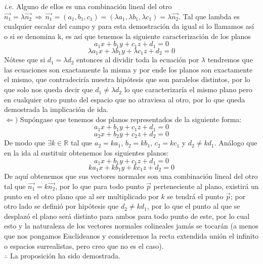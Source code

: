 \documentclass{article}
\begin{document}
\textit{i.e.} Alguno de ellos es una combinación lineal del otro $\Vec{n_1}=\lambda\Vec{n_2} \, \Rightarrow \, \Vec{n_1} = (a_1,b_1,c_1) = (\lambda a_1,\lambda b_1,\lambda c_1) = \lambda\Vec{n_2}$. Tal que lambda es cualquier escalar del campo y para esta demostración da igual si lo llamamos así o si se denomina k, es así que tenemos la siguiente caracterización de los planos
\begin{equation*}
    a_1x + b_1y + c_1z + d_1 = 0
\end{equation*}
\begin{equation*}
    \lambda a_1x + \lambda b_1y + \lambda c_1z + d_2 = 0
\end{equation*}
Nótese que si $d_1=\lambda d_2$ entonces al dividir toda la ecuación por $\lambda$ tendremos que las ecuaciones son exactamente la misma y por ende los planos son exactamente el mismo, que contradeciría nuestra hipótesis que son paralelos distintos, por lo que solo nos queda decir que $d_1 \neq \lambda d_2$ lo que caracterizaría el mismo plano pero en cualquier otro punto del espacio que no atraviesa al otro, por lo que queda demostrada la implicación de ida. \\
$\Leftarrow)$ Supóngase que tenemos dos planos representados de la siguiente forma:
\begin{equation*}
    a_1x + b_1y + c_1z + d_1 = 0
\end{equation*}
\begin{equation*}
    a_2x + b_2y + c_2z + d_2 = 0
\end{equation*}
De modo que $\exists k \in \mathbb{R}$ tal que $a_2=ka_1$, $b_2=kb_1$, $c_2=kc_1$ y $d_2 \neq kd_1$. Análogo que en la ida al sustituir obtenemos los siguientes planos:
\begin{equation*}
    a_1x + b_1y + c_1z + d_1 = 0
\end{equation*}
\begin{equation*}
    k a_1x + k b_1y + k c_1z + d_2 = 0
\end{equation*}
De aquí obtenemos que sus vectores normales son una combinación lineal del otro tal que $\Vec{n_1}=k\Vec{n_2}$, por lo que para todo punto $\Vec{p}$ perteneciente al plano, existirá un punto en el otro plano que al ser multiplicado por $k$ se tendrá el punto $\Vec{p}$; por otro lado se definió por hipótesis que $d_2 \neq kd_1$, por lo que el punto al que se desplazó el plano será distinto para ambos para todo punto de este, por lo cual esto y la naturaleza de los vectores normales colineales jamás se tocarán (a menos que nos pongamos Euclideanos y consideremos la recta extendida unión el infinito o espacios surrealistas, pero creo que no es el caso). \\
$\therefore$ La proposición ha sido demostrada.
\end{document}
